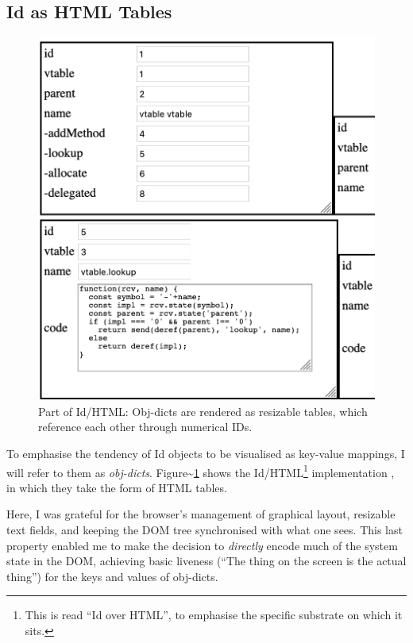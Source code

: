 \hypertarget{id-as-html-tables}{%
\subsection{Id as HTML Tables}\label{id-as-html-tables}}

\begin{figure}
  \centering
  \includegraphics[width=\linewidth]{orom-html.png}
  \caption{Part of Id{}/HTML: Obj-dicts are rendered as resizable tables, which reference
           each other through numerical IDs. \label{fig:orom-html}}
\end{figure}

To emphasise the tendency of Id{} objects to be visualised as key-value
mappings, I will refer to them as \emph{obj-dicts}.
Figure\textasciitilde{}\ref{fig:orom-html} shows the Id{}/HTML\footnote{This
  is read ``Id over HTML'', to emphasise the specific substrate on which
  it sits.} implementation \cite{orom-html}, in which they take the form
of HTML tables.

Here, I was grateful for the browser's management of graphical layout,
resizable text fields, and keeping the DOM tree synchronised with what
one sees. This last property enabled me to make the decision to
\emph{directly} encode much of the system state in the DOM, achieving
basic liveness (``The thing on the screen is the actual thing'') for the
keys and values of obj-dicts.

